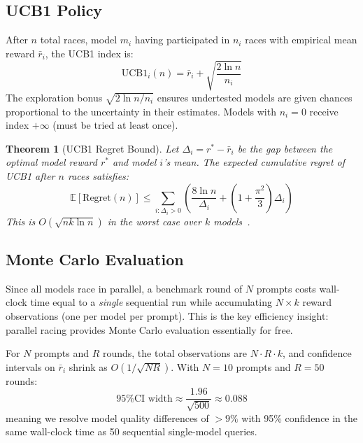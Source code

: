 \documentclass[11pt,twocolumn]{article}
\newtheorem{theorem}{Theorem}
\begin{document}
\subsection{UCB1 Policy}

After $n$ total races, model $m_i$ having participated in $n_i$ races with
empirical mean reward $\bar{r}_i$, the UCB1 index is:
\begin{equation}
  \text{UCB1}_i(n) = \bar{r}_i + \sqrt{\frac{2 \ln n}{n_i}}
\end{equation}
The exploration bonus $\sqrt{2 \ln n / n_i}$ ensures undertested models
are given chances proportional to the uncertainty in their estimates.
Models with $n_i = 0$ receive index $+\infty$ (must be tried at least once).

\begin{theorem}[UCB1 Regret Bound]
Let $\Delta_i = r^* - \bar{r}_i$ be the gap between the optimal model reward
$r^*$ and model $i$'s mean. The expected cumulative regret of UCB1 after $n$ races satisfies:
\begin{equation}
  \mathbb{E}[\text{Regret}(n)] \leq \sum_{i : \Delta_i > 0}
    \left( \frac{8 \ln n}{\Delta_i} + \left(1 + \frac{\pi^2}{3}\right)\Delta_i \right)
\end{equation}
This is $O(\sqrt{nk \ln n})$ in the worst case over $k$ models~\cite{auer2002finite}.
\end{theorem}

\subsection{Monte Carlo Evaluation}

Since all models race in parallel, a benchmark round of $N$ prompts costs
wall-clock time equal to a \emph{single} sequential run while accumulating
$N \times k$ reward observations (one per model per prompt). This is the
key efficiency insight: parallel racing provides Monte Carlo evaluation
essentially for free.

For $N$ prompts and $R$ rounds, the total observations are $N \cdot R \cdot k$,
and confidence intervals on $\bar{r}_i$ shrink as $O(1/\sqrt{NR})$.
With $N = 10$ prompts and $R = 50$ rounds:
\begin{equation}
  \text{95\% CI width} \approx \frac{1.96}{\sqrt{500}} \approx 0.088
\end{equation}
meaning we resolve model quality differences of $> 9\%$ with 95\% confidence
in the same wall-clock time as 50 sequential single-model queries.
\end{document}
